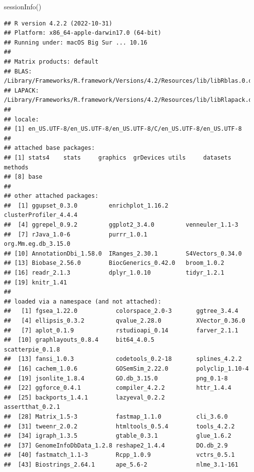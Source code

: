 \documentclass[
]{article}
\newenvironment{Shaded}{\begin{snugshade}}{\end{snugshade}}
\newcommand{\FunctionTok}[1]{\textcolor[rgb]{0.00,0.00,0.00}{#1}}
\newcommand{\NormalTok}[1]{#1}
\begin{document}
\begin{Shaded}
\begin{Highlighting}[]
\FunctionTok{sessionInfo}\NormalTok{()}
\end{Highlighting}
\end{Shaded}

\begin{verbatim}
## R version 4.2.2 (2022-10-31)
## Platform: x86_64-apple-darwin17.0 (64-bit)
## Running under: macOS Big Sur ... 10.16
## 
## Matrix products: default
## BLAS:   /Library/Frameworks/R.framework/Versions/4.2/Resources/lib/libRblas.0.dylib
## LAPACK: /Library/Frameworks/R.framework/Versions/4.2/Resources/lib/libRlapack.dylib
## 
## locale:
## [1] en_US.UTF-8/en_US.UTF-8/en_US.UTF-8/C/en_US.UTF-8/en_US.UTF-8
## 
## attached base packages:
## [1] stats4    stats     graphics  grDevices utils     datasets  methods  
## [8] base     
## 
## other attached packages:
##  [1] ggupset_0.3.0         enrichplot_1.16.2     clusterProfiler_4.4.4
##  [4] ggrepel_0.9.2         ggplot2_3.4.0         venneuler_1.1-3      
##  [7] rJava_1.0-6           purrr_1.0.1           org.Mm.eg.db_3.15.0  
## [10] AnnotationDbi_1.58.0  IRanges_2.30.1        S4Vectors_0.34.0     
## [13] Biobase_2.56.0        BiocGenerics_0.42.0   broom_1.0.2          
## [16] readr_2.1.3           dplyr_1.0.10          tidyr_1.2.1          
## [19] knitr_1.41           
## 
## loaded via a namespace (and not attached):
##   [1] fgsea_1.22.0           colorspace_2.0-3       ggtree_3.4.4          
##   [4] ellipsis_0.3.2         qvalue_2.28.0          XVector_0.36.0        
##   [7] aplot_0.1.9            rstudioapi_0.14        farver_2.1.1          
##  [10] graphlayouts_0.8.4     bit64_4.0.5            scatterpie_0.1.8      
##  [13] fansi_1.0.3            codetools_0.2-18       splines_4.2.2         
##  [16] cachem_1.0.6           GOSemSim_2.22.0        polyclip_1.10-4       
##  [19] jsonlite_1.8.4         GO.db_3.15.0           png_0.1-8             
##  [22] ggforce_0.4.1          compiler_4.2.2         httr_1.4.4            
##  [25] backports_1.4.1        lazyeval_0.2.2         assertthat_0.2.1      
##  [28] Matrix_1.5-3           fastmap_1.1.0          cli_3.6.0             
##  [31] tweenr_2.0.2           htmltools_0.5.4        tools_4.2.2           
##  [34] igraph_1.3.5           gtable_0.3.1           glue_1.6.2            
##  [37] GenomeInfoDbData_1.2.8 reshape2_1.4.4         DO.db_2.9             
##  [40] fastmatch_1.1-3        Rcpp_1.0.9             vctrs_0.5.1           
##  [43] Biostrings_2.64.1      ape_5.6-2              nlme_3.1-161          

\end{verbatim}
\end{document}
